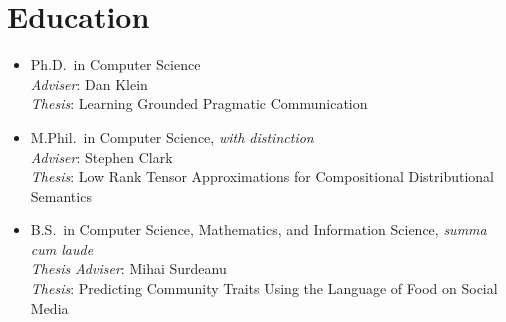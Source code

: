 \section{Education}
\begin{itemize}[leftmargin=-0.4mm,partopsep=0pt,label=]
  \item {}
    Ph.D.\ in Computer Science \\
    \emph{Adviser}: Dan Klein \\
    \emph{Thesis}: Learning Grounded Pragmatic Communication 

  \item {}
    M.Phil.\ in Computer Science, \emph{with distinction} \\
    \emph{Adviser}: Stephen Clark \\
    \emph{Thesis}: Low Rank Tensor Approximations for Compositional Distributional Semantics

  \item {}
    B.S.\ in Computer Science, Mathematics, and Information Science, \emph{summa cum laude} \\
    \emph{Thesis Adviser}: Mihai Surdeanu \\
    \emph{Thesis}: Predicting Community Traits Using the Language of Food on Social Media
\end{itemize}

